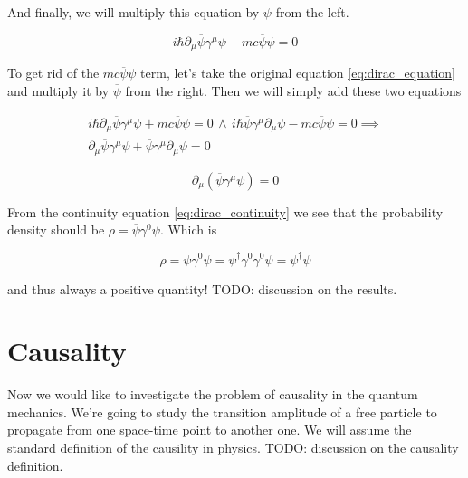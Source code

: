 And finally, we will multiply this equation by $\psi$ from the left.

\begin{equation}
    i \hbar \partial_{\mu} \overline{\psi} \gamma^{\mu} \psi + mc \overline{\psi} \psi = 0
\end{equation}

To get rid of the $mc \overline{\psi} \psi$ term, let's take the original equation \ref{eq:dirac_equation} and multiply it
by $\overline{\psi}$ from the right. Then we will simply add these two equations

\begin{equation*}
    \begin{gathered}
        i \hbar \partial_{\mu} \overline{\psi} \gamma^{\mu} \psi + mc \overline{\psi} \psi = 0 \, \land \,
        i \hbar \overline{\psi} \gamma^{\mu} \partial_{\mu} \psi - mc \overline{\psi} \psi = 0 \implies \\
        \partial_{\mu} \overline{\psi} \gamma^{\mu} \psi + \overline{\psi} \gamma^{\mu} \partial_{\mu} \psi = 0
    \end{gathered}
\end{equation*}

\begin{equation}
    \label{eq:dirac_continuity}
    \partial_{\mu} (\overline{\psi} \gamma^{\mu} \psi) = 0
\end{equation}

From the continuity equation \ref{eq:dirac_continuity} we see that the probability density should be $\rho = \overline{\psi} \gamma^{0} \psi$.
Which is

\begin{equation*}
    \rho = \overline{\psi} \gamma^{0} \psi = \psi^{\dagger} \gamma^{0} \gamma^{0} \psi = \psi^{\dagger} \psi
\end{equation*}

and thus always a positive quantity! TODO: discussion on the results.

\section{Causality}

Now we would like to investigate the problem of causality in the quantum mechanics. We're going to study the transition
amplitude of a free particle to propagate from one space-time point to another one. We will assume the standard definition
of the causility in physics. TODO: discussion on the causality definition.

